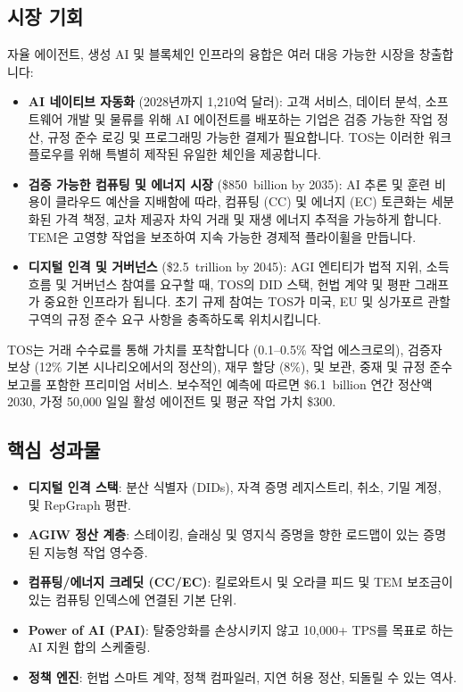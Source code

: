 \documentclass[11pt]{article}
\begin{document}
\subsection{시장 기회}
자율 에이전트, 생성 AI 및 블록체인 인프라의 융합은 여러 대응 가능한 시장을 창출합니다:
\begin{itemize}[noitemsep]
  \item \textbf{AI 네이티브 자동화} (2028년까지 1,210억 달러): 고객 서비스, 데이터 분석, 소프트웨어 개발 및 물류를 위해 AI 에이전트를 배포하는 기업은 검증 가능한 작업 정산, 규정 준수 로깅 및 프로그래밍 가능한 결제가 필요합니다. TOS는 이러한 워크플로우를 위해 특별히 제작된 유일한 체인을 제공합니다.
  \item \textbf{검증 가능한 컴퓨팅 및 에너지 시장} (\$850~billion by 2035): AI 추론 및 훈련 비용이 클라우드 예산을 지배함에 따라, 컴퓨팅 (CC) 및 에너지 (EC) 토큰화는 세분화된 가격 책정, 교차 제공자 차익 거래 및 재생 에너지 추적을 가능하게 합니다. TEM은 고영향 작업을 보조하여 지속 가능한 경제적 플라이휠을 만듭니다.
  \item \textbf{디지털 인격 및 거버넌스} (\$2.5~trillion by 2045): AGI 엔티티가 법적 지위, 소득 흐름 및 거버넌스 참여를 요구할 때, TOS의 DID 스택, 헌법 계약 및 평판 그래프가 중요한 인프라가 됩니다. 초기 규제 참여는 TOS가 미국, EU 및 싱가포르 관할 구역의 규정 준수 요구 사항을 충족하도록 위치시킵니다.
\end{itemize}

TOS는 거래 수수료를 통해 가치를 포착합니다 (0.1--0.5\% 작업 에스크로의), 검증자 보상 (12\% 기본 시나리오에서의 정산의), 재무 할당 (8\%), 및 보관, 중재 및 규정 준수 보고를 포함한 프리미엄 서비스. 보수적인 예측에 따르면 \$6.1~billion 연간 정산액 2030, 가정 50,000 일일 활성 에이전트 및 평균 작업 가치 \$300.

\subsection{핵심 성과물}
\begin{itemize}[noitemsep]
  \item \textbf{디지털 인격 스택}: 분산 식별자 (DIDs), 자격 증명 레지스트리, 취소, 기밀 계정, 및 RepGraph 평판.
  \item \textbf{AGIW 정산 계층}: 스테이킹, 슬래싱 및 영지식 증명을 향한 로드맵이 있는 증명된 지능형 작업 영수증.
  \item \textbf{컴퓨팅/에너지 크레딧 (CC/EC)}: 킬로와트시 및 오라클 피드 및 TEM 보조금이 있는 컴퓨팅 인덱스에 연결된 기본 단위.
  \item \textbf{Power of AI (PAI)}: 탈중앙화를 손상시키지 않고 10,000+ TPS를 목표로 하는 AI 지원 합의 스케줄링.
  \item \textbf{정책 엔진}: 헌법 스마트 계약, 정책 컴파일러, 지연 허용 정산, 되돌릴 수 있는 역사.
\end{itemize}
\end{document}
